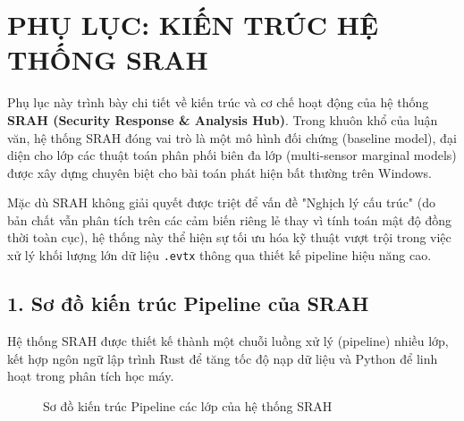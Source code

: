\documentclass[../main.tex]{subfiles}
\begin{document}
\chapter*{PHỤ LỤC: KIẾN TRÚC HỆ THỐNG SRAH}

Phụ lục này trình bày chi tiết về kiến trúc và cơ chế hoạt động của hệ thống \textbf{SRAH (Security Response \& Analysis Hub)}. Trong khuôn khổ của luận văn, hệ thống SRAH đóng vai trò là một mô hình đối chứng (baseline model), đại diện cho lớp các thuật toán phân phối biên đa lớp (multi-sensor marginal models) được xây dựng chuyên biệt cho bài toán phát hiện bất thường trên Windows.

Mặc dù SRAH không giải quyết được triệt để vấn đề "Nghịch lý cấu trúc" (do bản chất vẫn phân tích trên các cảm biến riêng lẻ thay vì tính toán mật độ đồng thời toàn cục), hệ thống này thể hiện sự tối ưu hóa kỹ thuật vượt trội trong việc xử lý khối lượng lớn dữ liệu \texttt{.evtx} thông qua thiết kế pipeline hiệu năng cao.

\section*{1. Sơ đồ kiến trúc Pipeline của SRAH}

Hệ thống SRAH được thiết kế thành một chuỗi luồng xử lý (pipeline) nhiều lớp, kết hợp ngôn ngữ lập trình Rust để tăng tốc độ nạp dữ liệu và Python để linh hoạt trong phân tích học máy.

\begin{figure}[H]
\centering
{}
\caption{Sơ đồ kiến trúc Pipeline các lớp của hệ thống SRAH}
\label{fig:srah_pipeline}
\end{figure}
\end{document}

